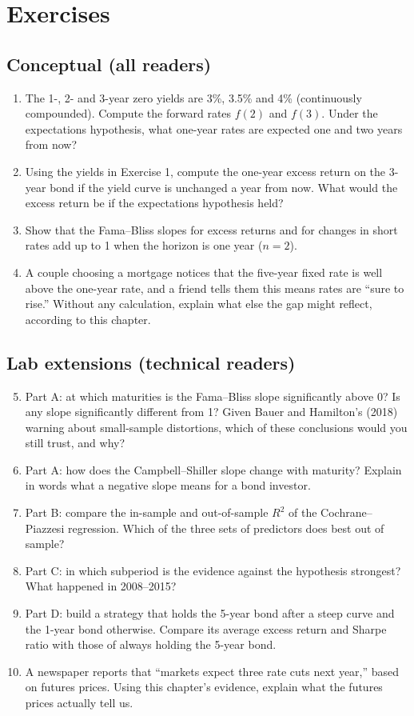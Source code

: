 \section*{Exercises}

\subsection*{Conceptual (all readers)}

\begin{enumerate}
  \item The 1-, 2- and 3-year zero yields are 3\%, 3.5\% and 4\% (continuously compounded). Compute the forward rates $f(2)$ and $f(3)$. Under the expectations hypothesis, what one-year rates are expected one and two years from now?
  \item Using the yields in Exercise 1, compute the one-year excess return on the 3-year bond if the yield curve is unchanged a year from now. What would the excess return be if the expectations hypothesis held?
  \item Show that the Fama--Bliss slopes for excess returns and for changes in short rates add up to 1 when the horizon is one year ($n = 2$).
  \item A couple choosing a mortgage notices that the five-year fixed rate is well above the one-year rate, and a friend tells them this means rates are ``sure to rise.'' Without any calculation, explain what else the gap might reflect, according to this chapter.
\end{enumerate}

\subsection*{Lab extensions (technical readers)}

\begin{enumerate}
  \setcounter{enumi}{4}
  \item Part A: at which maturities is the Fama--Bliss slope significantly above 0? Is any slope significantly different from 1? Given Bauer and Hamilton's (2018) warning about small-sample distortions, which of these conclusions would you still trust, and why?
  \item Part A: how does the Campbell--Shiller slope change with maturity? Explain in words what a negative slope means for a bond investor.
  \item Part B: compare the in-sample and out-of-sample $R^2$ of the Cochrane--Piazzesi regression. Which of the three sets of predictors does best out of sample?
  \item Part C: in which subperiod is the evidence against the hypothesis strongest? What happened in 2008--2015?
  \item Part D: build a strategy that holds the 5-year bond after a steep curve and the 1-year bond otherwise. Compare its average excess return and Sharpe ratio with those of always holding the 5-year bond.
  \item A newspaper reports that ``markets expect three rate cuts next year,'' based on futures prices. Using this chapter's evidence, explain what the futures prices actually tell us.
\end{enumerate}
